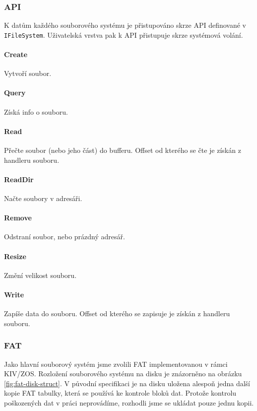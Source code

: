 \documentclass[11pt,a4paper]{scrartcl}
\begin{document}
	\subsubsection{API}
	K datům každého souborového systému je přistupováno skrze API definované v \verb|IFileSystem|. Uživatelská vrstva pak k API přistupuje skrze systémová volání.
	
	\paragraph{Create}
	Vytvoří soubor.
	
	\paragraph{Query}
	Získá info o souboru.
	
	\paragraph{Read}
	Přečte soubor (nebo jeho část) do bufferu. Offset od kterého se čte je získán z handleru souboru.
	
	\paragraph{ReadDir}
	Načte soubory v adresáři.
	
	\paragraph{Remove}
	Odstraní soubor, nebo prázdný adresář.
	
	\paragraph{Resize}
	Změní velikost souboru.
	
	\paragraph{Write}
	Zapíše data do souboru. Offset od kterého se zapisuje je získán z handleru souboru.
	
	
	\subsubsection{FAT}
	
	Jako hlavní souborový systém jsme zvolili FAT implementovanou v rámci KIV/ZOS. Rozložení souborového systému na disku je znázorněno na obrázku \ref{fig:fat-disk-struct}. V původní specifikaci je na disku uložena alespoň jedna další kopie FAT tabulky, která se používá ke kontrole bloků dat. Protože kontrolu poškozených dat v práci neprovádíme, rozhodli jsme se ukládat pouze jednu kopii.
	
\end{document}
